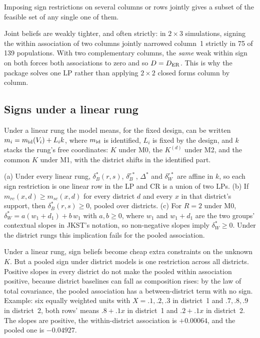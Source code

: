 \begin{proposition}\label{prop:joint}
Imposing sign restrictions on several columns or rows jointly gives a subset of the
feasible set of any single one of them.
\end{proposition}
\begin{reading}
Joint beliefs are weakly tighter, and often strictly: in $2\times3$ simulations,
signing the within association of two columns jointly narrowed column~1 strictly
in 75 of 139 populations. With two complementary columns, the \emph{same} weak
within sign on both forces both associations to zero and so $D=D_{\mathrm{ER}}$. This is
why the package solves one LP rather than applying $2\times2$ closed forms column
by column.
\end{reading}

\subsection{Signs under a linear rung}

Under a linear rung the model means, for the fixed design, can be written
$m_i=m_{\rm id}(V_i)+L_ik$, where $m_{\rm id}$ is identified, $L_i$ is fixed by the
design, and $k$ stacks the rung's free coordinates: $K$ under M0, the
$K^{(d)}$ under M2, and the common $K$ under M1, with the district shifts in the
identified part.

\begin{proposition}\label{prop:Krows}
(a) Under every linear rung, $\delta^*_B(r,s)$, $\delta^{r*}_B$, $\Delta^*$ and
$\delta^{r*}_W$ are affine in $k$, so each sign restriction is one linear row in
the LP and CR is a union of two LPs.
(b) If $m_{rc}(x,d)\ge m_{sc}(x,d)$ for every district $d$ and every $x$ in that
district's support, then $\delta^*_B(r,s)\ge0$, pooled over districts.
(c) For $R=2$ under M0, $\delta^*_W=a(w_1+d_1)+b\,w_1$ with $a,b\ge0$, where $w_1$
and $w_1+d_1$ are the two groups' contextual slopes in JKST's notation, so
non-negative slopes imply $\delta^*_W\ge0$. Under the district rungs this
implication fails for the pooled association.
\end{proposition}
\begin{reading}
Under a linear rung, sign beliefs become cheap extra constraints on the unknown
$K$. But a pooled sign under district models is one restriction across all
districts. Positive slopes in every district do not make the pooled within
association positive, because district baselines can fall as composition rises:
by the law of total covariance, the pooled association has a between-district term
with no sign. Example: six equally weighted units with $X=.1,.2,.3$ in district~1
and $.7,.8,.9$ in district~2, both rows' means $.8+.1x$ in district~1 and $.2+.1x$ in
district~2. The slopes are positive, the within-district association is
$+0.00064$, and the pooled one is $-0.04927$.
\end{reading}

